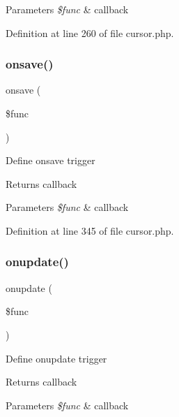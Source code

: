 \begin{DoxyParams}{Parameters}
{\em \$func} & callback \\
\hline
\end{DoxyParams}


Definition at line 260 of file cursor.\+php.

\hypertarget{class_d_b_1_1_cursor_a507f285ea3bb622446f79e07e838e147}{}\label{class_d_b_1_1_cursor_a507f285ea3bb622446f79e07e838e147} 
\subsubsection{\texorpdfstring{onsave()}{onsave()}}
{\footnotesize\ttfamily onsave (\begin{DoxyParamCaption}\item[{}]{\$func }\end{DoxyParamCaption})}

Define onsave trigger \begin{DoxyReturn}{Returns}
callback 
\end{DoxyReturn}

\begin{DoxyParams}{Parameters}
{\em \$func} & callback \\
\hline
\end{DoxyParams}


Definition at line 345 of file cursor.\+php.

\hypertarget{class_d_b_1_1_cursor_a6af536a479e72aff418c5965eff20320}{}\label{class_d_b_1_1_cursor_a6af536a479e72aff418c5965eff20320} 
\subsubsection{\texorpdfstring{onupdate()}{onupdate()}}
{\footnotesize\ttfamily onupdate (\begin{DoxyParamCaption}\item[{}]{\$func }\end{DoxyParamCaption})}

Define onupdate trigger \begin{DoxyReturn}{Returns}
callback 
\end{DoxyReturn}

\begin{DoxyParams}{Parameters}
{\em \$func} & callback \\
\hline
\end{DoxyParams}


